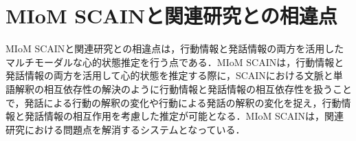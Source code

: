 
\section{MIoM SCAINと関連研究との相違点}
\par
MIoM SCAINと関連研究との相違点は，行動情報と発話情報の両方を活用したマルチモーダルな心的状態推定を行う点である．MIoM SCAINは，行動情報と発話情報の両方を活用して心的状態を推定する際に，SCAINにおける文脈と単語解釈の相互依存性の解決のように行動情報と発話情報の相互依存性を扱うことで，発話による行動の解釈の変化や行動による発話の解釈の変化を捉え，行動情報と発話情報の相互作用を考慮した推定が可能となる．MIoM SCAINは，関連研究における問題点を解消するシステムとなっている．
